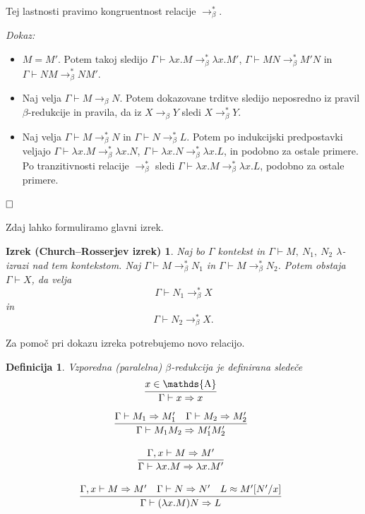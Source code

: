 \documentclass{article}
\DeclareMathOperator{\Atoms}{\mathds{A}}
\newcommand{\inference}[3][]{\infer[#1]{#3}{#2}}
\def\qed{$\hfill\Box$}   %
\newtheorem{definicija}{Definicija}
\newtheorem{izrek_crosser}{Izrek (Church–Rosserjev izrek)}
\begin{document}
Tej lastnosti pravimo kongruentnost relacije \(\rightarrow_\beta^*\).

\noindent
{\em Dokaz:\/}

\begin{itemize}
    \item \(M = M'\). Potem takoj sledijo \(\Gamma \vdash \lambda x.M \rightarrow_\beta^* \lambda x.M'\), \(\Gamma \vdash MN \rightarrow_\beta^* M'N\) in \(\Gamma \vdash NM \rightarrow_\beta^* NM'\).
    \item Naj velja \(\Gamma \vdash M \rightarrow_\beta N\). Potem dokazovane trditve sledijo neposredno iz pravil \(\beta\)-redukcije in pravila, da iz \(X \rightarrow_\beta Y\) sledi \(X \rightarrow_\beta^* Y\). 
    \item Naj velja \(\Gamma \vdash M \rightarrow_\beta^* N\) in \(\Gamma \vdash N \rightarrow_\beta^* L\). Potem po indukcijski predpostavki veljajo \(\Gamma \vdash \lambda x.M \rightarrow_\beta^* \lambda x.N\), \(\Gamma \vdash \lambda x.N \rightarrow_\beta^* \lambda x.L\), in podobno za ostale primere. Po tranzitivnosti relacije \(\rightarrow_\beta^*\) sledi \(\Gamma \vdash \lambda x.M \rightarrow_\beta^* \lambda x.L\), podobno za ostale primere.
\end{itemize}
\qed


Zdaj lahko formuliramo glavni izrek.
\begin{izrek_crosser}
    Naj bo \(\Gamma\) kontekst in \(\Gamma \vdash M,\ N_1,\ N_2\) \(\lambda\)-izrazi nad tem kontekstom. Naj \(\Gamma \vdash M \rightarrow_\beta^* N_1\) in \(\Gamma \vdash M \rightarrow_\beta^* N_2\). Potem obstaja \(\Gamma \vdash X\), da velja
    \[
        \Gamma \vdash N_1 \rightarrow_\beta^* X
    \]
    in
    \[
        \Gamma \vdash N_2 \rightarrow_\beta^* X.
    \]
\end{izrek_crosser}


Za pomoč pri dokazu izreka potrebujemo novo relacijo.

\begin{definicija}
    Vzporedna (paralelna) \(\beta\)-redukcija je definirana sledeče
    \[
    \inference{x \in \Atoms}{\Gamma \vdash x \Rightarrow x}
    \]
    \[
    \inference{\Gamma \vdash M_1 \Rightarrow M_1' \quad \Gamma \vdash M_2 \Rightarrow M_2'}{\Gamma \vdash M_1 M_2 \Rightarrow M_1' M_2'}
    \]

    \[
    \inference{\Gamma, x \vdash M \Rightarrow M'}{\Gamma \vdash \lambda x. M \Rightarrow \lambda x. M'}
    \]

    \[
    \inference{\Gamma, x \vdash M \Rightarrow M' \quad \Gamma \vdash N \Rightarrow N' \quad L \approx M'[N'/x]}{\Gamma \vdash (\lambda x. M) N \Rightarrow L}
    \]
\end{definicija}
\end{document}
